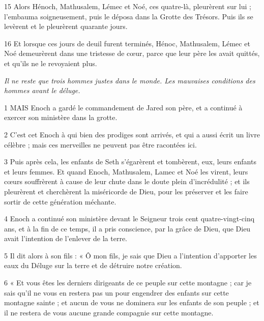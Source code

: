 \par 15 Alors Hénoch, Mathusalem, Lémec et Noé, ces quatre-là, pleurèrent sur lui ; l'embauma soigneusement, puis le déposa dans la Grotte des Trésors. Puis ils se levèrent et le pleurèrent quarante jours.

\par 16 Et lorsque ces jours de deuil furent terminés, Hénoc, Mathusalem, Lémec et Noé demeurèrent dans une tristesse de cœur, parce que leur père les avait quittés, et qu'ils ne le revoyaient plus.


\par \textit{Il ne reste que trois hommes justes dans le monde. Les mauvaises conditions des hommes avant le déluge.}

\par 1 MAIS Enoch a gardé le commandement de Jared son père, et a continué à exercer son ministère dans la grotte.

\par 2 C'est cet Enoch à qui bien des prodiges sont arrivés, et qui a aussi écrit un livre célèbre ; mais ces merveilles ne peuvent pas être racontées ici.

\par 3 Puis après cela, les enfants de Seth s'égarèrent et tombèrent, eux, leurs enfants et leurs femmes. Et quand Enoch, Mathusalem, Lamec et Noé les virent, leurs cœurs souffrèrent à cause de leur chute dans le doute plein d'incrédulité ; et ils pleurèrent et cherchèrent la miséricorde de Dieu, pour les préserver et les faire sortir de cette génération méchante.

\par 4 Enoch a continué son ministère devant le Seigneur trois cent quatre-vingt-cinq ans, et à la fin de ce temps, il a pris conscience, par la grâce de Dieu, que Dieu avait l'intention de l'enlever de la terre.

\par 5 Il dit alors à son fils : « Ô mon fils, je sais que Dieu a l'intention d'apporter les eaux du Déluge sur la terre et de détruire notre création.

\par 6 « Et vous êtes les derniers dirigeants de ce peuple sur cette montagne ; car je sais qu'il ne vous en restera pas un pour engendrer des enfants sur cette montagne sainte ; et aucun de vous ne dominera sur les enfants de son peuple ; et il ne restera de vous aucune grande compagnie sur cette montagne.

